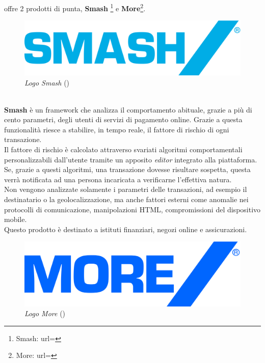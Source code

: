 \textit{\azienda} offre 2 prodotti di punta, \textbf{Smash\textregistered} \footnote{Smash: url= } e \textbf{More\textregistered}\footnote{More: url= }.\\
\begin{figure}[h!]
	\centering
	\includegraphics[scale=0.1]{immagini/smash.png}
	\caption{\textit{Logo Smash\textregistered} ()}
\end{figure}
\\
\textbf{Smash\textregistered} è un \gls{framework} che analizza il comportamento abituale, grazie a più di cento parametri, degli utenti di servizi di pagamento online. Grazie a questa funzionalità riesce a stabilire, in tempo reale, il fattore di rischio di ogni transazione.\\
Il fattore di rischio è calcolato attraverso svariati algoritmi comportamentali personalizzabili dall'utente tramite un apposito \textit{editor} integrato alla piattaforma. Se, grazie a questi algoritmi, una transazione dovesse risultare sospetta, questa verrà notificata ad una persona incaricata a verificarne l'effettiva natura.\\
Non vengono analizzate solamente i parametri delle transazioni, ad esempio il destinatario o la geolocalizzazione, ma anche fattori esterni come anomalie nei protocolli di comunicazione, manipolazioni HTML, compromissioni del dispositivo mobile.\\
Questo prodotto è destinato a istituti finanziari, negozi online e assicurazioni.\\
\begin{figure}[h!]
	\centering
	\includegraphics[scale=0.1]{immagini/more.png}
	\caption{\textit{Logo More\textregistered} ()}
\end{figure}
